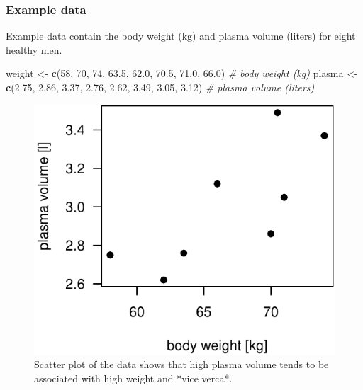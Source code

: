 \documentclass[]{article}
\newenvironment{Shaded}{\begin{snugshade}}{\end{snugshade}}
\newcommand{\CommentTok}[1]{\textcolor[rgb]{0.56,0.35,0.01}{\textit{#1}}}
\newcommand{\DecValTok}[1]{\textcolor[rgb]{0.00,0.00,0.81}{#1}}
\newcommand{\FloatTok}[1]{\textcolor[rgb]{0.00,0.00,0.81}{#1}}
\newcommand{\KeywordTok}[1]{\textcolor[rgb]{0.13,0.29,0.53}{\textbf{#1}}}
\newcommand{\NormalTok}[1]{#1}
\newcommand{\StringTok}[1]{\textcolor[rgb]{0.31,0.60,0.02}{#1}}
\begin{document}
\hypertarget{example-data}{%
\subsubsection{Example data}\label{example-data}}

Example data contain the body weight (kg) and plasma volume (liters) for
eight healthy men.

\begin{Shaded}
\begin{Highlighting}[]
\NormalTok{weight <-}\StringTok{ }\KeywordTok{c}\NormalTok{(}\DecValTok{58}\NormalTok{, }\DecValTok{70}\NormalTok{, }\DecValTok{74}\NormalTok{, }\FloatTok{63.5}\NormalTok{, }\FloatTok{62.0}\NormalTok{, }\FloatTok{70.5}\NormalTok{, }\FloatTok{71.0}\NormalTok{, }\FloatTok{66.0}\NormalTok{) }\CommentTok{# body weight (kg)}
\NormalTok{plasma <-}\StringTok{ }\KeywordTok{c}\NormalTok{(}\FloatTok{2.75}\NormalTok{, }\FloatTok{2.86}\NormalTok{, }\FloatTok{3.37}\NormalTok{, }\FloatTok{2.76}\NormalTok{, }\FloatTok{2.62}\NormalTok{, }\FloatTok{3.49}\NormalTok{, }\FloatTok{3.05}\NormalTok{, }\FloatTok{3.12}\NormalTok{) }\CommentTok{# plasma volume (liters)}
\end{Highlighting}
\end{Shaded}

\begin{figure}[H]

{\centering \includegraphics{session-regression-I-files/figures/fig-intro-example-1} 

}

\caption{Scatter plot of the data shows that high plasma volume tends to be associated with high weight and *vice verca*.}\label{fig:fig-intro-example}
\end{figure}
\end{document}
